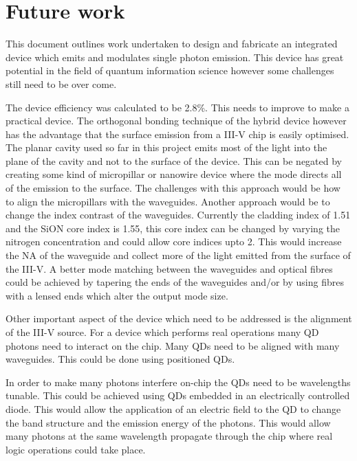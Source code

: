 
\chapter{Future work}

This document outlines work undertaken to design and fabricate an integrated
device which emits and modulates single photon emission. This device has great
potential in the field of quantum information science however some challenges
still need to be over come.

The device efficiency was calculated to be 2.8\%. This needs to improve to make
a practical device. The orthogonal bonding technique of
the hybrid device however has the advantage that the surface emission from a
III-V chip is easily optimised. The planar cavity used so far in this project
emits most of the light into the plane of the cavity and not to the surface of
the device. This can be negated by creating some kind of micropillar or nanowire
device where the mode directs all of the emission to the surface. The challenges
with this approach would be how to align the micropillars with the waveguides.
Another approach would be to change the index contrast of the waveguides.
Currently the cladding index of 1.51 and the SiON core index is 1.55, this core
index can be changed by varying the nitrogen concentration and could allow core
indices upto 2. This would increase the NA of the waveguide and collect more of
the light emitted from the surface of the III-V. A better mode matching between
the waveguides and optical fibres could be achieved by tapering the ends of the
waveguides and/or by using fibres with a lensed ends which alter the output mode
size.

Other important aspect of the device which need to be addressed is the
alignment of the III-V source. For a device which performs real operations many
QD photons need to interact on the chip. Many QDs need to be aligned with many waveguides.
This could be done using positioned QDs.

In order to make many photons interfere on-chip the QDs need to be wavelengths
tunable.  This could be achieved using QDs embedded in an electrically
controlled diode. This would allow the application of an electric field to the
QD to change the band structure and the emission energy of the photons. This
would allow many photons at the same wavelength propagate through the chip where
real logic operations could take place.

